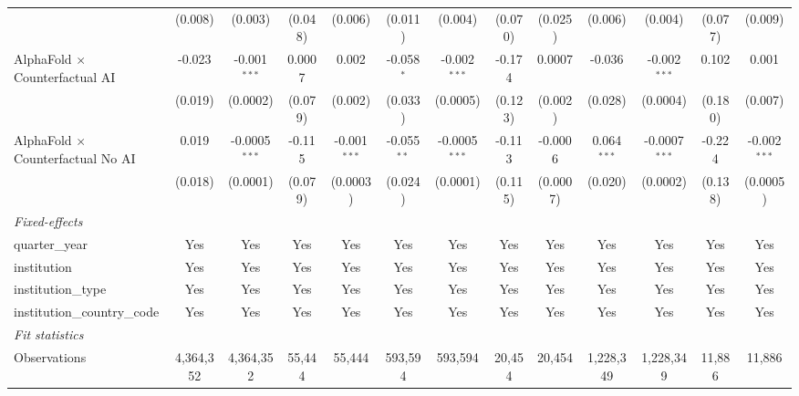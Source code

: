 \begin{tabular}{lcccccccccccc}
                                            & (0.008)       & (0.003)         & (0.048)       & (0.006)        & (0.011)       & (0.004)         & (0.070) & (0.025)  & (0.006)       & (0.004)         & (0.077)       & (0.009)\\   
   AlphaFold $\times$ Counterfactual AI     & -0.023        & -0.001$^{***}$  & 0.0007        & 0.002          & -0.058$^{*}$  & -0.002$^{***}$  & -0.174  & 0.0007   & -0.036        & -0.002$^{***}$  & 0.102         & 0.001\\   
                                            & (0.019)       & (0.0002)        & (0.079)       & (0.002)        & (0.033)       & (0.0005)        & (0.123) & (0.002)  & (0.028)       & (0.0004)        & (0.180)       & (0.007)\\   
   AlphaFold $\times$ Counterfactual No AI  & 0.019         & -0.0005$^{***}$ & -0.115        & -0.001$^{***}$ & -0.055$^{**}$ & -0.0005$^{***}$ & -0.113  & -0.0006  & 0.064$^{***}$ & -0.0007$^{***}$ & -0.224        & -0.002$^{***}$\\   
                                            & (0.018)       & (0.0001)        & (0.079)       & (0.0003)       & (0.024)       & (0.0001)        & (0.115) & (0.0007) & (0.020)       & (0.0002)        & (0.138)       & (0.0005)\\   
   \midrule
   \emph{Fixed-effects}\\
   quarter\_year                            & Yes           & Yes             & Yes           & Yes            & Yes           & Yes             & Yes     & Yes      & Yes           & Yes             & Yes           & Yes\\  
   institution                              & Yes           & Yes             & Yes           & Yes            & Yes           & Yes             & Yes     & Yes      & Yes           & Yes             & Yes           & Yes\\  
   institution\_type                        & Yes           & Yes             & Yes           & Yes            & Yes           & Yes             & Yes     & Yes      & Yes           & Yes             & Yes           & Yes\\  
   institution\_country\_code               & Yes           & Yes             & Yes           & Yes            & Yes           & Yes             & Yes     & Yes      & Yes           & Yes             & Yes           & Yes\\  
   \midrule
   \emph{Fit statistics}\\
   Observations                             & 4,364,352     & 4,364,352       & 55,444        & 55,444         & 593,594       & 593,594         & 20,454  & 20,454   & 1,228,349     & 1,228,349       & 11,886        & 11,886\\  

\end{tabular}
